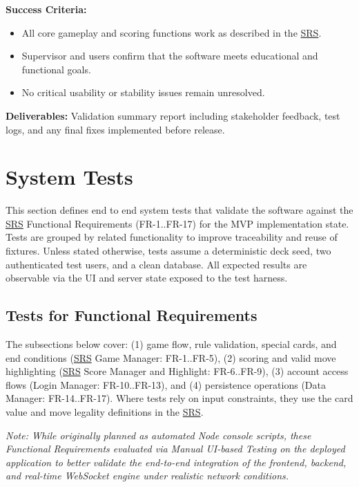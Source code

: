 \documentclass[12pt, titlepage]{article}
\begin{document}
\noindent\textbf{Success Criteria:}
\begin{itemize}
    \item All core gameplay and scoring functions work as described in the \href{../SRS/SRS.pdf}{SRS}.  
    \item Supervisor and users confirm that the software meets educational and functional goals.  
    \item No critical usability or stability issues remain unresolved.
\end{itemize}

\noindent\textbf{Deliverables:}  
Validation summary report including stakeholder feedback, test logs, and any final fixes implemented before release.


\section{System Tests}

This section defines end to end system tests that validate the software against the \href{../SRS/SRS.pdf}{SRS} Functional Requirements (FR-1..FR-17) for the MVP implementation state. Tests are grouped by related functionality to improve traceability and reuse of fixtures. Unless stated otherwise, tests assume a deterministic deck seed, two authenticated test users, and a clean database. All expected results are observable via the UI and server state exposed to the test harness.

\subsection{Tests for Functional Requirements}

The subsections below cover: (1) game flow, rule validation, special cards, and end conditions (\href{../SRS/SRS.pdf}{SRS} Game Manager: FR-1..FR-5), (2) scoring and valid move highlighting (\href{../SRS/SRS.pdf}{SRS} Score Manager and Highlight: FR-6..FR-9), (3) account access flows (Login Manager: FR-10..FR-13), and (4) persistence operations (Data Manager: FR-14..FR-17). Where tests rely on input constraints, they use the card value and move legality definitions in the \href{../SRS/SRS.pdf}{SRS}.

\textit{Note: While originally planned as automated Node console scripts, these Functional Requirements evaluated via Manual UI-based Testing on the deployed application to better validate the end-to-end integration of the frontend, backend, and real-time WebSocket engine under realistic network conditions.}
\end{document}
